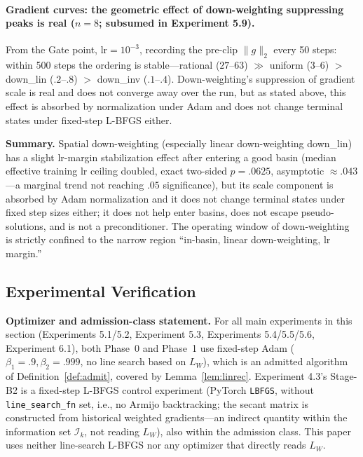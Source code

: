 \documentclass[11pt]{article}
\newcommand{\W}{W}
\numberwithin{equation}{section}
\begin{document}
\paragraph{Gradient curves: the geometric effect of down-weighting suppressing peaks is real ($n=8$; subsumed in Experiment 5.9).}
From the Gate point, lr$=10^{-3}$, recording the pre-clip $\|g\|_2$ every 50 steps: within 500 steps the ordering is stable---rational ($27$--$63$) $\gg$ uniform ($3$--$6$) $>$ down\_lin ($.2$--$.8$) $>$ down\_inv ($.1$--$.4$). Down-weighting's suppression of gradient scale is real and does not converge away over the run, but as stated above, this effect is absorbed by normalization under Adam and does not change terminal states under fixed-step L-BFGS either.

\medskip
\noindent\textbf{Summary.} Spatial down-weighting (especially linear down-weighting down\_lin) has a slight lr-margin stabilization effect after entering a good basin (median effective training lr ceiling doubled, exact two-sided $p=.0625$, asymptotic $\approx.043$---a marginal trend not reaching $.05$ significance), but its scale component is absorbed by Adam normalization and it does not change terminal states under fixed step sizes either; it does not help enter basins, does not escape pseudo-solutions, and is not a preconditioner. The operating window of down-weighting is strictly confined to the narrow region ``in-basin, linear down-weighting, lr margin.''

\subsection{Experimental Verification}\label{sec:theta-exp}

\noindent\textbf{Optimizer and admission-class statement.} For all main experiments in this section (Experiments 5.1/5.2, Experiment 5.3, Experiments 5.4/5.5/5.6, Experiment 6.1), both Phase~0 and Phase~1 use fixed-step Adam ($\beta_1=.9,\beta_2=.999$, no line search based on $L_\W$), which is an admitted algorithm of Definition~\ref{def:admit}, covered by Lemma~\ref{lem:linrec}. Experiment 4.3's Stage-B2 is a fixed-step L-BFGS control experiment (PyTorch \texttt{LBFGS}, without \texttt{line\_search\_fn} set, i.e., no Armijo backtracking; the secant matrix is constructed from historical weighted gradients---an indirect quantity within the information set $\mathcal I_k$, not reading $L_\W$), also within the admission class. This paper uses neither line-search L-BFGS nor any optimizer that directly reads $L_\W$.
\end{document}
